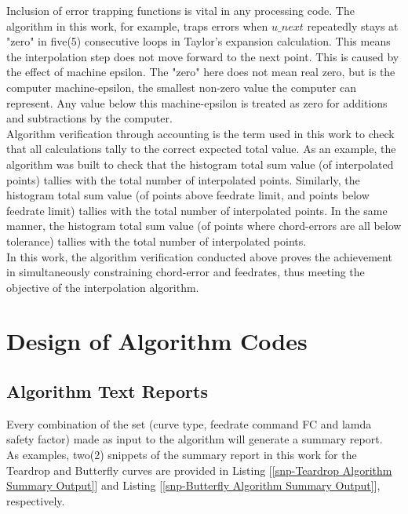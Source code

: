 Inclusion of error trapping functions is vital in any processing code. The algorithm in this work, for example, traps errors when $u\_next$ repeatedly stays at "zero" in five(5) consecutive loops in Taylor's expansion calculation. This means the interpolation step does not move forward to the next point. This is caused by the effect of machine epsilon. The "zero" here does not mean real zero, but is the computer machine-epsilon, the smallest non-zero value the computer can represent. Any value below this machine-epsilon is treated as zero for additions and subtractions by the computer. \\ 
	
Algorithm verification through accounting is the term used in this work to check that all calculations tally to the correct expected total value. As an example, the algorithm was built to check that the histogram total sum value (of interpolated points) tallies with the total number of interpolated points. Similarly, the histogram total sum value (of points above feedrate limit, and points below feedrate limit) tallies with the total number of interpolated points. In the same manner, the histogram total sum value (of points where chord-errors are all below tolerance) tallies with the total number of interpolated points.\\
	
In this work, the algorithm verification conducted above proves the achievement in simultaneously constraining chord-error and feedrates, thus meeting the objective of the interpolation algorithm.   \\



\section{Design of Algorithm Codes}

\subsection{Algorithm Text Reports}

Every combination of the set (curve type, feedrate command FC and lamda safety factor) made as input to the algorithm will generate a summary report.\\

As examples, two(2) snippets of the summary report in this work for the Teardrop and Butterfly curves are provided in Listing [\ref{snp-Teardrop Algorithm Summary Output}] and Listing [\ref{snp-Butterfly Algorithm Summary Output}], respectively.\\

